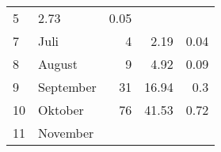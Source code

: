 \begin{longtable}{lXrrr}
       \num{5} &
       \num[round-mode=places,round-precision=2]{2,73} &
         \num[round-mode=places,round-precision=2]{0,05} \\

     7 &
     \multicolumn{1}{X}{ Juli   } &


       \num{4} &
       \num[round-mode=places,round-precision=2]{2,19} &
         \num[round-mode=places,round-precision=2]{0,04} \\

     8 &
     \multicolumn{1}{X}{ August   } &


       \num{9} &
       \num[round-mode=places,round-precision=2]{4,92} &
         \num[round-mode=places,round-precision=2]{0,09} \\

     9 &
     \multicolumn{1}{X}{ September   } &


       \num{31} &
       \num[round-mode=places,round-precision=2]{16,94} &
         \num[round-mode=places,round-precision=2]{0,3} \\

     10 &
     \multicolumn{1}{X}{ Oktober   } &


       \num{76} &
       \num[round-mode=places,round-precision=2]{41,53} &
         \num[round-mode=places,round-precision=2]{0,72} \\

     11 &
     \multicolumn{1}{X}{ November   } &



\end{longtable}

